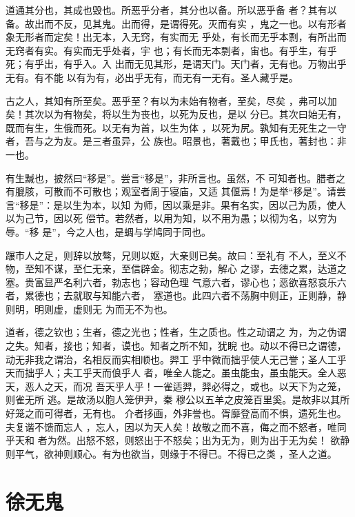 \documentclass[12pt,UTF8]{ctexbook}
\begin{document}
道通其分也，其成也毁也。所恶乎分者，其分也以备。所以恶乎备 者？其有以备。故出而不反，见其鬼。出而得，是谓得死。灭而有实 ，鬼之一也。以有形者象无形者而定矣！出无本，入无窍，有实而无 乎处，有长而无乎本剽，有所出而无窍者有实。有实而无乎处者，宇 也；有长而无本剽者，宙也。有乎生，有乎死；有乎出，有乎入。入 出而无见其形，是谓天门。天门者，无有也。万物出乎无有。有不能 以有为有，必出乎无有，而无有一无有。圣人藏乎是。

古之人，其知有所至矣。恶乎至？有以为未始有物者，至矣，尽矣 ，弗可以加矣！其次以为有物矣，将以生为丧也，以死为反也，是以 分已。其次曰始无有，既而有生，生俄而死。以无有为首，以生为体 ，以死为尻。孰知有无死生之一守者，吾与之为友。是三者虽异，公 族也。昭景也，著戴也；甲氏也，著封也：非一也。

有生黬也，披然曰“移是”。尝言“移是”，非所言也。虽然，不 可知者也。腊者之有膍胲，可散而不可散也；观室者周于寝庙，又适 其偃焉！为是举“移是”。请尝言“移是”：是以生为本，以知 为师，因以乘是非。果有名实，因以己为质，使人以为己节，因以死 偿节。若然者，以用为知，以不用为愚；以彻为名，以穷为辱。“移 是”，今之人也，是蜩与学鸠同于同也。

蹍市人之足，则辞以放骜，兄则以妪，大亲则已矣。故曰：至礼有 不人，至义不物，至知不谋，至仁无亲，至信辟金。彻志之勃，解心 之谬，去德之累，达道之塞。贵富显严名利六者，勃志也；容动色理 气意六者，谬心也；恶欲喜怒哀乐六者，累德也；去就取与知能六者， 塞道也。此四六者不荡胸中则正，正则静，静则明，明则虚，虚则无 为而无不为也。

道者，德之钦也；生者，德之光也；性者，生之质也。性之动谓之 为，为之伪谓之失。知者，接也；知者，谟也。知者之所不知，犹睨 也。动以不得已之谓德，动无非我之谓治，名相反而实相顺也。羿工 乎中微而拙乎使人无己誉；圣人工乎天而拙乎人；夫工乎天而俍乎人 者，唯全人能之。虽虫能虫，虽虫能天。全人恶天，恶人之天，而况 吾天乎人乎！一雀适羿，羿必得之，或也。以天下为之笼，则雀无所 逃。是故汤以胞人笼伊尹，秦 穆公以五羊之皮笼百里奚。是故非以其所好笼之而可得者，无有也。 介者拸画，外非誉也。胥靡登高而不惧，遗死生也。夫复谐不馈而忘人 ，忘人，因以为天人矣！故敬之而不喜，侮之而不怒者，唯同乎天和 者为然。出怒不怒，则怒出于不怒矣；出为无为，则为出于无为矣！ 欲静则平气，欲神则顺心。有为也欲当，则缘于不得已。不得已之类 ，圣人之道。
\section{徐无鬼}
\end{document}
